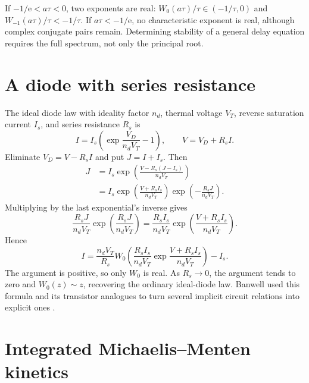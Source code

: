 \documentclass[11pt,oneside]{book}
\theoremstyle{definition}
\theoremstyle{remark}
\newcommand{\ee}{\mathrm e}
\begin{document}
If $-1/\ee<a\tau<0$, two exponents are real:
$W_0(a\tau)/\tau\in(-1/\tau,0)$ and
$W_{-1}(a\tau)/\tau<-1/\tau$.  If $a\tau<-1/\ee$, no characteristic exponent
is real, although complex conjugate pairs remain.  Determining stability of a
general delay equation requires the full spectrum, not only the principal
root.

\section{A diode with series resistance}

The ideal diode law with ideality factor $n_d$, thermal voltage $V_T$, reverse
saturation current $I_s$, and series resistance $R_s$ is
\begin{equation}\label{eq:diodesystem}
 I=I_s\left(\exp\frac{V_D}{n_dV_T}-1\right),
 \qquad
 V=V_D+R_s I.
\end{equation}
Eliminate $V_D=V-R_sI$ and put $J=I+I_s$.  Then
\begin{align*}
 J
 &=I_s\exp\!\left(\frac{V-R_s(J-I_s)}{n_dV_T}\right)\\
 &=I_s\exp\!\left(\frac{V+R_sI_s}{n_dV_T}\right)
       \exp\!\left(-\frac{R_sJ}{n_dV_T}\right).
\end{align*}
Multiplying by the last exponential's inverse gives
\[
 \frac{R_sJ}{n_dV_T}
 \exp\!\left(\frac{R_sJ}{n_dV_T}\right)
 =\frac{R_sI_s}{n_dV_T}
 \exp\!\left(\frac{V+R_sI_s}{n_dV_T}\right).
\]
Hence
\begin{equation}\label{eq:diodesolution}
 \boxed{
 I=\frac{n_dV_T}{R_s}
 W_0\!\left(
 \frac{R_sI_s}{n_dV_T}
 \exp\!\frac{V+R_sI_s}{n_dV_T}
 \right)-I_s.}
\end{equation}
The argument is positive, so only $W_0$ is real.  As $R_s\to0$, the argument
tends to zero and $W_0(z)\sim z$, recovering the ordinary ideal-diode law.
Banwell used this formula and its transistor analogues to turn several
implicit circuit relations into explicit ones \cite{banwell2000}.

\section{Integrated Michaelis--Menten kinetics}
\end{document}
